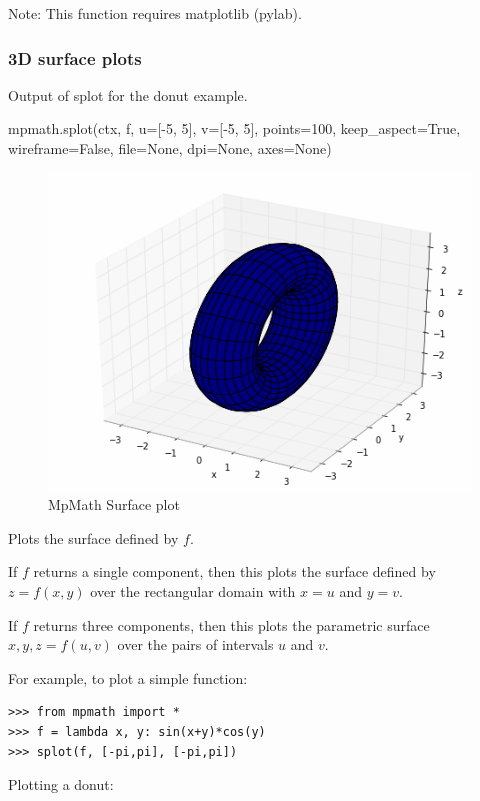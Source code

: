 Note: This function requires matplotlib (pylab).


\newpage
\subsubsection{3D surface plots}


Output of splot for the donut example.

\vpara
mpmath.splot(ctx, f, u=[-5, 5], v=[-5, 5], points=100, keep\_aspect=True, wireframe=False, file=None, dpi=None, axes=None)

\begin{figure}[ht]
	\centering
	\includegraphics[scale=1.0]{Charts/png/MpMathSplot.png}
	\caption{MpMath Surface plot}
	\label{Fig MpMath Surface plot}
\end{figure}


Plots the surface defined by $f$.

\vpara
If $f$ returns a single component, then this plots the surface defined by $z=f(x,y)$ over the rectangular domain with $x=u$  and $y=v$.

\vpara
If $f$ returns three components, then this plots the parametric surface $x,y,z = f(u,v)$ over the pairs of intervals $u$ and $v$.

\vpara
For example, to plot a simple function:

\begin{lstlisting}
>>> from mpmath import *
>>> f = lambda x, y: sin(x+y)*cos(y)
>>> splot(f, [-pi,pi], [-pi,pi])
\end{lstlisting}


Plotting a donut:

